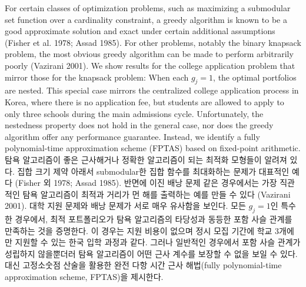 \documentclass[11pt]{article} %
\theoremstyle{definition}
\theoremstyle{definition}
\begin{document}
\ifen
For certain classes of optimization problems, such as maximizing a submodular set function over a cardinality constraint, a greedy algorithm is known to be a good approximate solution and exact under certain additional assumptions (Fisher et al. 1978; Assad 1985). For other problems, notably the binary knapsack problem, the most obvious greedy algorithm can be made to perform arbitrarily poorly (Vazirani 2001). We show results for the college application problem that mirror those for the knapsack problem: When each $g_j = 1$, the optimal portfolios are nested. This special case mirrors the centralized college application process in Korea, where there is no application fee, but students are allowed to apply to only three schools during the main admissions cycle. Unfortunately, the nestedness property does not hold in the general case, nor does the greedy algorithm offer any performance guarantee. Instead, we identify a fully polynomial-time approximation scheme (FPTAS) based on fixed-point arithmetic. 
\else
탐욕 알고리즘이 좋은 근사해거나 정확한 알고리즘이 되는 최적화 모형들이 알려져 있다. 집합 크기 제약 아래서 submodular한 집합 함수를 최대화하는 문제가 대표적인 예다 (Fisher 외 1978; Assad 1985). 반면에 이진 배낭 문제 같은 경우에서는 가장 직관적인 탐욕 알고리즘이 최적과 거리가 먼 해를 출력하는 예를 만들 수 있다 (Vazirani 2001). 대학 지원 문제와 배낭 문제가 서로 매우 유사함을 보인다. 모든 $g_j=1$인 특수한 경우에서, 최적 포트폴리오가 탐욕 알고리즘의 타당성과 동등한 포함 사슬 관계를 만족하는 것을 증명한다. 이 경우는 지원 비용이 없으며 정시 모집 기간에 학교 3개에만 지원할 수 있는 한국 입학 과정과 같다. 그러나 일반적인 경우에서 포함 사슬 관계가 성립하지 않을뿐더러 탐욕 알고리즘이 어떤 근사 계수를 보장할 수 없을 보일 수 있다. 대신 고정소숫점 산술을 활용한 완전 다항 시간 근사 해법(fully polynomial-time approximation scheme, FPTAS)을 제시한다.
\fi
\end{document}

